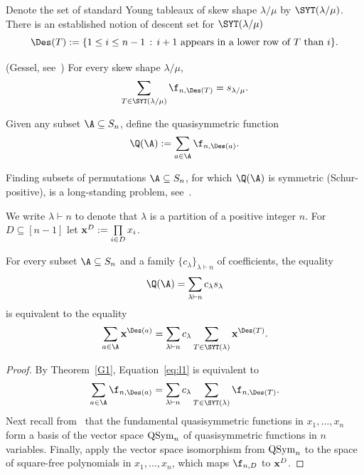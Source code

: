 Denote the set of standard Young tableaux of skew shape $\lambda/\mu$ by $\SYT(\lambda/\mu)$.
There is an established notion of descent set for $\SYT(\lambda/\mu)$
\begin{equation}\label{def:Des_SYT}
    \Des(T) := 
    \{1 \le i \le n-1 \,:\, i+1 \text{ appears in a lower row of }T\text{ than }i\}.
\end{equation}

\begin{theorem}{\rm (Gessel, see~\cite[Theorem 7.19.7]{EC2})}\label{G1} 
    For every skew shape $\lambda/\mu$,
    \[
        \sum\limits_{T\in \SYT(\lambda/\mu)}\f_{n,\Des(T)}=s_{\lambda/\mu}.
    \]
\end{theorem}	
		
Given any subset $\A\subseteq S_n$, define the quasisymmetric function
\[
    \Q(\A) := \sum_{a \in \A} \f_{n,\Des(a)}.
\]

Finding subsets of permutations $\A\subseteq S_n$, for which $\Q(\A)$ is symmetric (Schur-positive), is a  long-standing problem, see~\cite{GR}. 

We write $\lambda\vdash n$ to denote that $\lambda$ is a partition of a positive integer $n$.  
For $D\subseteq [n-1]$ let ${\bf x}^D:=\prod\limits_{i\in D}x_i$.

\begin{lemma}\label{lem:Schur-gf}
    For every subset $\A\subseteq S_n$ and a family $\{c_\lambda\}_{\lambda \vdash n}$
    of coefficients, the equality
    \begin{equation}\label{eq:l1}
        \Q(\A) =\sum_{\lambda\vdash n} c_{\lambda} s_{\lambda}
    \end{equation}
    is equivalent to the equality
    \begin{equation}\label{eq:l2}
        \sum\limits_{a\in \A} {\bf x}^{\Des(a)} = \sum_{\lambda\vdash n} c_{\lambda} 
        \sum_{T\in \SYT(\lambda)}{\bf x}^{\Des(T)}.
    \end{equation}
\end{lemma}

\begin{proof}
    By Theorem~\ref{G1}, 
    Equation~\eqref{eq:l1} is equivalent to
    \[
        \sum\limits_{a\in \A} \f_{n,\Des(a)}= \sum\limits_{\lambda\vdash n} c_{\lambda} \sum\limits_{T\in \SYT(\lambda)}\f_{n,\Des(T)}.
    \]
    Next recall from~\cite[Ch.~7]{EC2} that the fundamental quasisymmetric functions in $x_1,\dots,x_n$
    form a basis of the vector space ${\rm{QSym}}_n$ of quasisymmetric functions in $n$ variables.
    Finally, apply the vector space isomorphism from ${\rm{QSym}}_n$ 
    to the space of 
    square-free polynomials in $x_1,\ldots,x_n$, which maps 
    $\f_{n,D}$ to ${\bf x}^D$. 
\end{proof}

